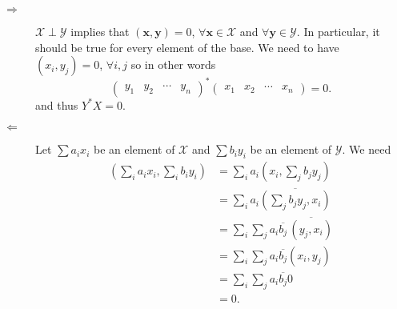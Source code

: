 \begin{solution}
  \begin{description}
    \item[$\Rightarrow$]
      $\mathcal{X} \perp \mathcal{Y}$ implies that 
      $(\mathbf{x},\mathbf{y}) = 0$, $\forall \mathbf{x} \in \mathcal{X}$ 
      and $\forall \mathbf{y} \in \mathcal{Y}$.
      In particular, it should be true for every element of the base.
      We need to have $(x_i,y_j) = 0$, $\forall i,j$ so in other words
      \[
        \begin{pmatrix}
          y_1 & y_2 & \cdots & y_n
        \end{pmatrix}^*
        \begin{pmatrix}
          x_1 & x_2 & \cdots & x_n
        \end{pmatrix}
        = 0.
      \]
      and thus $Y^* X = 0$.
    \item[$\Leftarrow$]
      Let $\sum a_ix_i$ be an element of $\mathcal{X}$ and $\sum b_iy_i$ be an element of $\mathcal{Y}$.
      We need
      \begin{align*}
        (\sum_i a_ix_i, \sum_i b_iy_i)
        & = \sum_i a_i (x_i, \sum_j b_jy_j)\\
        & = \sum_i a_i \overline{(\sum_j b_jy_j, x_i)}\\
        & = \sum_i \sum_j a_i\overline{b_j} \, \overline{(y_j, x_i)}\\
        & = \sum_i \sum_j a_i\overline{b_j} (x_i, y_j)\\
        & = \sum_i \sum_j a_i \overline{b_j} 0\\
        & = 0.
      \end{align*}
  \end{description}
\end{solution}

